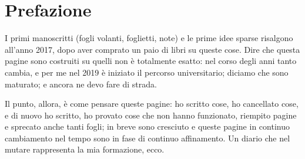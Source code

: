 
\thispagestyle{empty}

\section*{Prefazione}

I primi manoscritti (fogli volanti, foglietti, note) e le prime idee sparse risalgono all'anno 2017, dopo aver comprato un paio di libri su queste cose. Dire che questa pagine sono costruiti su quelli non è totalmente esatto: nel corso degli anni tanto cambia, e per me nel 2019 è iniziato il percorso universitario; diciamo che sono maturato; e ancora ne devo fare di strada.

Il punto, allora, è come pensare queste pagine: ho scritto cose, ho cancellato cose, e di nuovo ho scritto, ho provato cose che non hanno funzionato, riempito pagine e sprecato anche tanti fogli; in breve sono cresciuto e queste pagine in continuo cambiamento nel tempo sono in fase di continuo affinamento. Un diario che nel mutare rappresenta la mia formazione, ecco.

\cleardoublepage